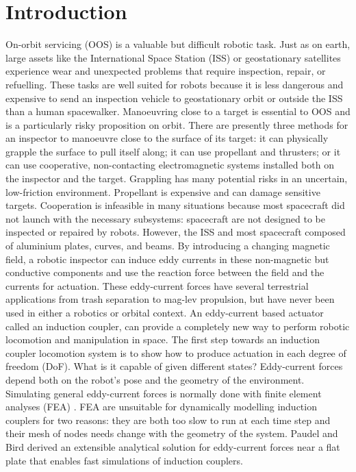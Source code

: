 \documentclass[letterpaper, 10 pt, conference]{ieeeconf}  %
\begin{document}
\section{Introduction}
On-orbit servicing (OOS)\label{def:OOS} is a valuable but difficult robotic task. \cite{Coleshill2009}\cite{Ellery2004}\cite{Ellery2008}  
Just as on earth, large assets like the International Space Station (ISS) \label{def:ISS} or geostationary satellites experience wear and unexpected problems that require inspection, repair, or refuelling.\cite{Moosavian2007}  These tasks are well suited for robots because it is less dangerous and expensive to send an inspection vehicle to geostationary orbit or outside the ISS than a human spacewalker.  
%
Manoeuvring close to a target is essential to OOS and is a particularly risky proposition on orbit. There are presently three methods for an inspector to manoeuvre close to the surface of its target: it can physically grapple the surface to pull itself along; it can use propellant and thrusters; or it can use cooperative, non-contacting electromagnetic systems installed both on the inspector and the target. Grappling has many potential risks in an uncertain, low-friction environment. Propellant is expensive and can damage sensitive targets. Cooperation is infeasible in many situations because most spacecraft did not launch with the necessary subsystems: spacecraft are not designed to be inspected or repaired by robots.
%
However, the ISS and most spacecraft composed of aluminium plates, curves, and beams. By introducing a changing magnetic field, a robotic inspector can induce eddy currents in these non-magnetic but conductive components and use the reaction force between the field and the currents for actuation.\cite{Smyth1989} These eddy-current forces have several terrestrial applications from trash separation \cite{Rem1997} to mag-lev propulsion,\cite{} but have never been used in either a robotics or orbital context. An eddy-current based actuator called an induction coupler, can provide a completely new way to perform robotic locomotion and manipulation in space. 
%
The first step towards an induction coupler locomotion system is to show how to produce actuation in each degree of freedom (DoF)\label{def:dof}. What is it capable of given different states? Eddy-current forces depend both on the robot's pose and the geometry of the environment. Simulating general eddy-current forces is normally done with finite element analyses (FEA)\label{def:fea} \cite{}. FEA are unsuitable for dynamically modelling induction couplers for two reasons: they are both too slow to run at each time step and their mesh of nodes needs change with the geometry of the system. Paudel and Bird derived an extensible analytical solution for eddy-current forces near a flat plate that enables fast simulations of induction couplers.\cite{Paudel2013}
\end{document}

